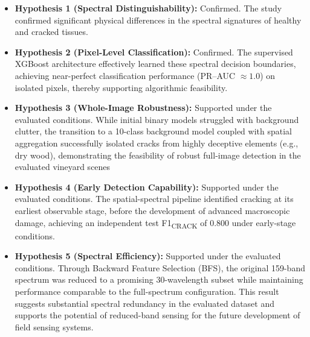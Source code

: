 \begin{itemize}
    \item \textbf{Hypothesis 1 (Spectral Distinguishability):} Confirmed. The study confirmed significant physical differences in the spectral signatures of healthy and cracked tissues. 
    
    \item \textbf{Hypothesis 2 (Pixel-Level Classification):} Confirmed. The supervised XGBoost architecture effectively learned these spectral decision boundaries, achieving near-perfect classification performance (PR--AUC $\approx 1.0$) on isolated pixels, thereby supporting algorithmic feasibility.
    
    \item \textbf{Hypothesis 3 (Whole-Image Robustness):} Supported under the evaluated conditions. While initial binary models struggled with background clutter, the transition to a 10-class background model coupled with spatial aggregation successfully isolated cracks from highly deceptive elements (e.g., dry wood), demonstrating the feasibility of robust full-image detection in the evaluated vineyard scenes
    
    \item \textbf{Hypothesis 4 (Early Detection Capability):} Supported under the evaluated conditions. The spatial-spectral pipeline identified cracking at its earliest observable stage, before the development of advanced macroscopic damage, achieving an independent test F1\textsubscript{CRACK} of 0.800 under early-stage conditions.
    
    \item \textbf{Hypothesis 5 (Spectral Efficiency):} Supported under the evaluated conditions. Through Backward Feature Selection (BFS), the original 159-band spectrum was reduced to a promising 30-wavelength subset while maintaining performance comparable to the full-spectrum configuration. This result suggests substantial spectral redundancy in the evaluated dataset and supports the potential of reduced-band sensing for the future development of field sensing systems.
\end{itemize}


